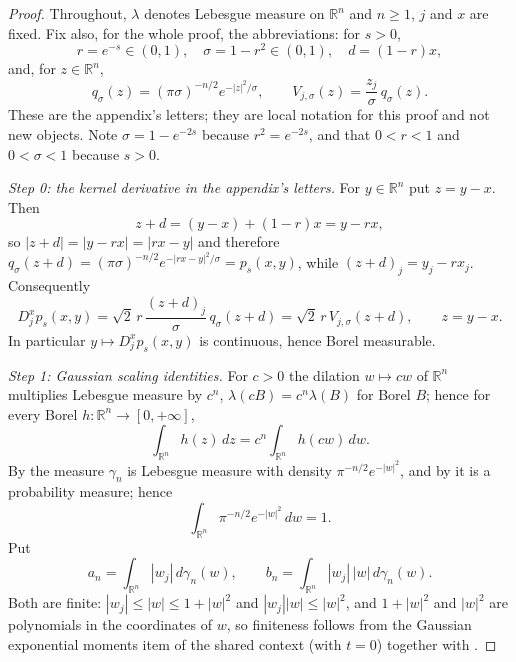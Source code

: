 \begin{proof}
Throughout, $\lambda$ denotes Lebesgue measure on $\mathbb{R}^n$ and $n \geq 1$,
$j$ and $x$ are fixed.  Fix also, for the whole proof, the abbreviations: for
$s > 0$,
\[
  r = e^{-s} \in (0,1),\quad \sigma = 1-r^2 \in (0,1),\quad d = (1-r)x,
\]
and, for $z \in \mathbb{R}^n$,
\[
  q_\sigma(z) = (\pi\sigma)^{-n/2}e^{-|z|^2/\sigma},
  \qquad
  V_{j,\sigma}(z) = \frac{z_j}{\sigma}\,q_\sigma(z) .
\]
These are the appendix's letters; they are local notation for this proof and not
new objects.  Note $\sigma = 1-e^{-2s}$ because $r^2 = e^{-2s}$, and that
$0 < r < 1$ and $0 < \sigma < 1$ because $s > 0$.

\emph{Step 0: the kernel derivative in the appendix's letters.}
For $y \in \mathbb{R}^n$ put $z = y - x$.  Then
\[
  z + d = (y-x) + (1-r)x = y - rx ,
\]
so $|z+d| = |y-rx| = |rx-y|$ and therefore
$q_\sigma(z+d) = (\pi\sigma)^{-n/2}e^{-|rx-y|^2/\sigma} = p_s(x,y)$, while
$(z+d)_j = y_j - rx_j$.  Consequently
\begin{equation*}
  D_j^xp_s(x,y)
    = \sqrt2\,r\,\frac{(z+d)_j}{\sigma}\,q_\sigma(z+d)
    = \sqrt2\,r\,V_{j,\sigma}(z+d),
  \qquad z = y-x . \tag{0}
\end{equation*}
In particular $y \mapsto D_j^xp_s(x,y)$ is continuous, hence Borel measurable.

\emph{Step 1: Gaussian scaling identities.}
For $c > 0$ the dilation $w \mapsto cw$ of $\mathbb{R}^n$ multiplies Lebesgue
measure by $c^n$, $\lambda(cB) = c^n\lambda(B)$ for Borel $B$; hence for every
Borel $h : \mathbb{R}^n \to [0,+\infty]$,
\begin{equation*}
  \int_{\mathbb{R}^n} h(z)\,dz = c^n\int_{\mathbb{R}^n} h(cw)\,dw . \tag{1}
\end{equation*}
By  the measure $\gamma_n$ is Lebesgue measure with
density $\pi^{-n/2}e^{-|w|^2}$, and by  it is a probability
measure; hence
\begin{equation*}
  \int_{\mathbb{R}^n} \pi^{-n/2}e^{-|w|^2}\,dw = 1 . \tag{2}
\end{equation*}
Put
\[
  a_n = \int_{\mathbb{R}^n} |w_j|\,d\gamma_n(w),
  \qquad
  b_n = \int_{\mathbb{R}^n} |w_j|\,|w|\,d\gamma_n(w) .
\]
Both are finite: $|w_j| \leq |w| \leq 1 + |w|^2$ and $|w_j||w| \leq |w|^2$, and
$1+|w|^2$ and $|w|^2$ are polynomials in the coordinates of $w$, so finiteness
follows from the Gaussian exponential moments item of the shared context (with
$t = 0$) together with .


\end{proof}
